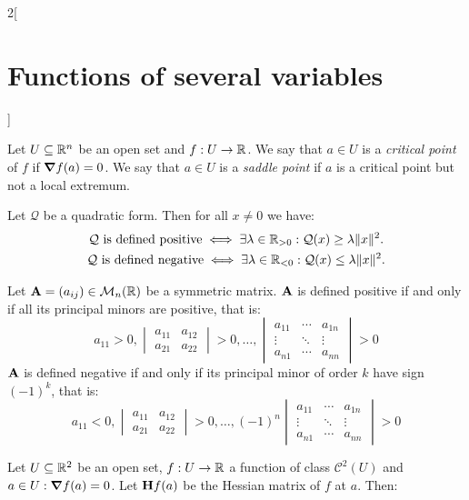 \documentclass[../../../main.tex]{subfiles}
\begin{document}
\begin{multicols}{2}[\section{Functions of several variables}]
  \begin{definition}
    Let $U\subseteq\mathbb{R}^n$ be an open set and $f:U\rightarrow\mathbb{R} $. We say that $a\in U$ is a \emph{critical point} of $f$ if $\grad f(a)=0$. We say that $a\in U$ is a \emph{saddle point} if $a$ is a critical point but not a local extremum.
  \end{definition}
  \begin{theorem}
    Let $\mathcal{Q}$ be a quadratic form. Then for all $x\ne 0$ we have:
    \begin{gather*}
      \mathcal{Q}\text{ is defined positive}\iff\exists\lambda\in\mathbb{R}_{>0}:\mathcal{Q}(x)\geq\lambda\|x\|^2.\\
      \mathcal{Q}\text{ is defined negative}\iff\exists\lambda\in\mathbb{R}_{<0}:\mathcal{Q}(x)\leq\lambda\|x\|^2.
    \end{gather*}
  \end{theorem}
  \begin{proposition}
    Let $\boldsymbol{\mathrm{A}}=(a_{ij})\in\mathcal{M}_n(\mathbb{R} )$ be a symmetric matrix. $\boldsymbol{\mathrm{A}}$ is defined positive if and only if all its principal minors are positive, that is:
    $$a_{11}>0,
      \begin{vmatrix}
        a_{11} & a_{12} \\
        a_{21} & a_{22}\end{vmatrix}>0,\ldots,
      \begin{vmatrix}
        a_{11} & \cdots & a_{1n} \\
        \vdots & \ddots & \vdots \\
        a_{n1} & \cdots & a_{nn}
      \end{vmatrix}>0$$
    $\boldsymbol{\mathrm{A}}$ is defined negative if and only if its principal minor of order $k$ have sign $(-1)^k$, that is:
    $$a_{11}<0,
      \begin{vmatrix}
        a_{11} & a_{12} \\
        a_{21} & a_{22}
      \end{vmatrix}>0,\ldots,
      (-1)^n\begin{vmatrix}
        a_{11} & \cdots & a_{1n} \\
        \vdots & \ddots & \vdots \\
        a_{n1} & \cdots & a_{nn}
      \end{vmatrix}>0$$
  \end{proposition}
  \begin{theorem}
    Let $U\subseteq\mathbb{R}^2$ be an open set, $f:U\rightarrow\mathbb{R} $ a function of class $\mathcal{C}^2(U)$ and $a\in U:\grad f(a)=0$. Let $\boldsymbol{\mathrm{H}}f(a)$ be the Hessian matrix of $f$ at $a$. Then:

\end{theorem}
\end{multicols}
\end{document}
